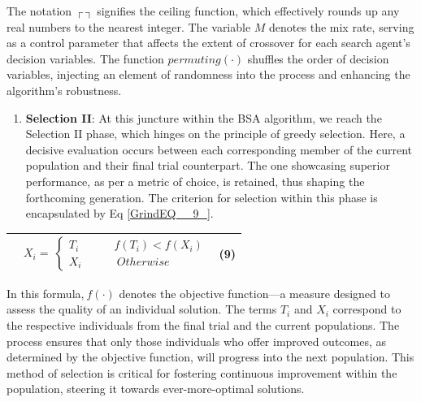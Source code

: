 \documentclass{article} %
\begin{document}
The notation $\mathrm{\textrm{┌}}\mathrm{\ }\mathrm{\textrm{┐}}$ signifies the ceiling function, which effectively rounds up any real numbers to the nearest integer. The variable $M$ denotes the mix rate, serving as a control parameter that affects the extent of crossover for each search agent's decision variables. The function $permuting(\cdot )$ shuffles the order of decision variables, injecting an element of randomness into the process and enhancing the algorithm's robustness.

\begin{enumerate}
\item  \textbf{Selection II}: At this juncture within the BSA algorithm, we reach the Selection II phase, which hinges on the principle of greedy selection. Here, a decisive evaluation occurs between each corresponding member of the current population and their final trial counterpart. The one showcasing superior performance, as per a metric of choice, is retained, thus shaping the forthcoming generation. The criterion for selection within this phase is encapsulated by Eq \eqref{GrindEQ__9_}.
\end{enumerate}

\begin{tabular}{|p{0.4in}|p{2.9in}|p{0.5in}|} \hline 
 & $X_i=\ \left\{ \begin{array}{c}
T_i\ \ \ \ \ \ \ \ \ \ \ \ \ \ f\left(T_i\right)<f\left(X_i\right) \\ 
X_i\ \ \ \ \ \ \ \ \ \ \ \ \ \ Otherwise \end{array}
\right.$ & (9) \\ \hline 
\end{tabular}

In this formula,$\ f(\textrm{·})$ denotes the objective function---a measure designed to assess the quality of an individual solution. The terms  $T_i$ and $X_i$ correspond to the respective individuals from the final trial and the current populations. The process ensures that only those individuals who offer improved outcomes, as determined by the objective function, will progress into the next population. This method of selection is critical for fostering continuous improvement within the population, steering it towards ever-more-optimal solutions.
\end{document}
